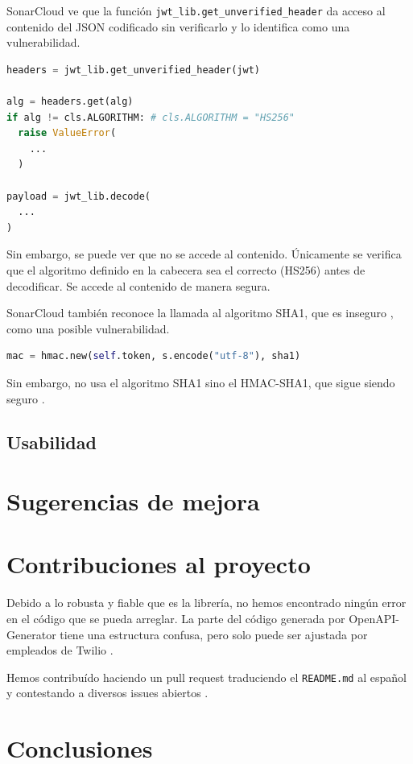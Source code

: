 \documentclass{article}
\begin{document}
\hfill

SonarCloud ve que la función \verb|jwt_lib.get_unverified_header|
da acceso al contenido del JSON codificado sin verificarlo
y lo identifica como una vulnerabilidad.

\begin{lstlisting}[language=Python]
headers = jwt_lib.get_unverified_header(jwt)

alg = headers.get(alg)
if alg != cls.ALGORITHM: # cls.ALGORITHM = "HS256"
  raise ValueError(
    ...
  )

payload = jwt_lib.decode(
  ...
)
\end{lstlisting}

Sin embargo, se puede ver que no se accede al contenido.
Únicamente se verifica que el algoritmo definido en la cabecera
sea el correcto (HS256) antes de decodificar.
Se accede al contenido de manera segura.

\hfill

SonarCloud también reconoce la llamada al algoritmo SHA1,
que es inseguro \cite{sha1-broken},
como una posible vulnerabilidad.

\begin{lstlisting}[language=Python]
mac = hmac.new(self.token, s.encode("utf-8"), sha1)
\end{lstlisting}

Sin embargo, no usa el algoritmo SHA1
sino el HMAC-SHA1, que sigue siendo seguro \cite{hmac-sha1}.

\subsection{Usabilidad}

\section{Sugerencias de mejora}

\section{Contribuciones al proyecto}

Debido a lo robusta y fiable que es la librería,
no hemos encontrado ningún error en el código que se pueda arreglar.
La parte del código generada por OpenAPI-Generator
tiene una estructura confusa,
pero solo puede ser ajustada por empleados de Twilio \cite{contributing}.

Hemos contribuído haciendo un pull request
traduciendo el \verb|README.md| al español
\cite{contribución-readme}
y contestando a diversos issues abiertos
\cite{contribución-repeated-code}
\cite{contribución-security-improvements}
\cite{contribución-wrong-login}.

\section{Conclusiones}

\newpage

\printbibliography
\end{document}
